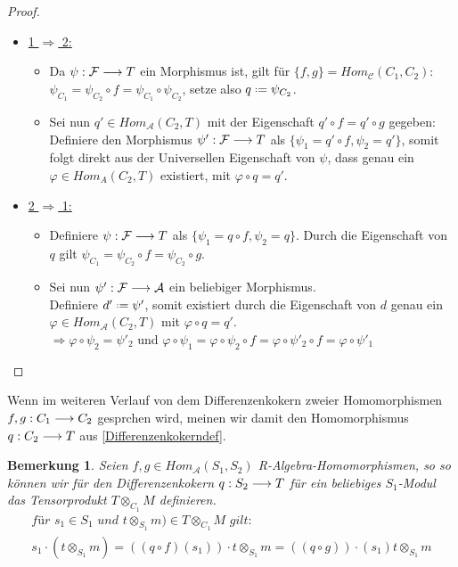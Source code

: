 \documentclass[10pt,a4paper]{report}
\newtheorem{bem}[satz]{Bemerkung}
\newcommand{\functionfront}[3]{\nolinebreak{#1:#2 \longrightarrow #3}}
\newcommand{\tensor}[3]{#1 \otimes_{#2} #3}
\newcommand*{\defeq}{\mathrel{\vcenter{\baselineskip0.5ex \lineskiplimit0pt
                     \hbox{\scriptsize.}\hbox{\scriptsize.}}}%
                     =}
\begin{document}
\begin{proof}
\ \\
\begin{itemize}
\item \underline{1 $\Rightarrow$ 2:}
\begin{itemize}
\item[] Da $\functionfront{\psi}{\mathcal{F}}{T}$ ein Morphismus ist, gilt für $\lbrace f,g \rbrace = Hom_{\mathcal{C}}(C_1,C_2)$:\\ $\psi_{C_1} = \psi_{C_2} \circ f = \psi_{C_1} \circ \psi_{C_2}$, setze also 
 $q  \defeq \psi_{C_2}$.
\item[] Sei nun $q' \in Hom_{\mathcal{A}}(C_2,T)$ mit der Eigenschaft $q' \circ f = q' \circ g$ gegeben:\\
 Definiere den Morphismus $\functionfront{\psi '}{\mathcal{F}}{T}$ als $\lbrace \psi_1 = q' \circ f , \psi_2 = q' \rbrace$,  somit folgt direkt aus der Universellen Eigenschaft von $\psi$, dass genau ein $\varphi \in Hom_{A}(C_2,T)$ existiert, mit $ \varphi \circ q = q '$.
\end{itemize}
\item \underline{2 $\Rightarrow$ 1:}
\begin{itemize}
\item[] Definiere $\functionfront{\psi }{\mathcal{F}}{T}$ als $\lbrace \psi_1 = q \circ f , \psi_2 = q \rbrace$.
Durch die Eigenschaft von $q$ gilt $\psi_{C_1} = \psi_{C_2} \circ f = \psi_{C_2} \circ g$.
\item[] Sei nun $\functionfront{\psi '}{\mathcal{F}}{\mathcal{A}}$ ein beliebiger Morphismus.\\
Definiere $d' \defeq \psi '$, somit existiert durch die Eigenschaft von $d$ genau ein $\varphi \in Hom_{\mathcal{A}}(C_2,T)$ mit $\varphi \circ q = q'$. \\
$\Rightarrow \varphi \circ \psi_2 = \psi '_2$ 
und $\varphi \circ \psi_1 = \varphi \circ \psi_2 \circ f = \varphi \circ \psi '_2 \circ f = \varphi \circ \psi '_1$
\end{itemize}
\end{itemize}
\end{proof}

Wenn im weiteren Verlauf von dem Differenzenkokern zweier Homomorphismen $\functionfront{f,g}{C_1}{C_2}$ gesprchen wird, meinen wir damit den Homomorphismus $\functionfront{q}{C_2}{T}$ aus \cref{Differenzenkokerndef}.

\begin{bem}
Seien $f,g \in Hom_{\mathcal{A}}(S_1,S_2)$ R-Algebra-Homomorphismen, so so können wir für den Differenzenkokern $\functionfront{q}{S_2}{T}$ für ein beliebiges $S_1$-Modul das Tensorprodukt $\tensor{T}{C_1}{M}$ definieren.
\begin{gather*}
\textit{für } s_1 \in S_1 \textit{ und } \tensor{t}{S_1}{m}) \in \tensor{T}{C_1}{M} \textit{ gilt: }\\
s_1 \cdot (\tensor{t}{S_1}{m}) = \tensor{((q \circ f)(s_1)) \cdot t}{S_1}{m} = \tensor{((q \circ g)) \cdot (s_1)t}{S_1}{m}
\end{gather*}
\end{bem}
\end{document}
